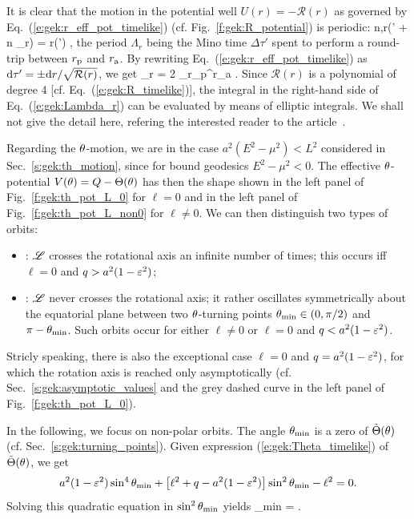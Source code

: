 It is clear that the motion in the potential well $U(r) = - \mathcal{R}(r)$
as governed by Eq.~(\ref{e:gek:r_eff_pot_timelike})
(cf. Fig.~\ref{f:gek:R_potential}) is periodic:
\be
    \forall n\in{},\quad r(\tau' + n \Lambda_r) = r(\tau') ,
\ee
the period
$\Lambda_r$ being the Mino time $\Delta\tau'$ spent to perform a round-trip
between $r_{\rm p}$ and $r_{\rm a}$. By rewriting Eq.~(\ref{e:gek:r_eff_pot_timelike})
as $\mathrm{d}\tau' = \pm \mathrm{d} r / \sqrt{\mathcal{R}(r)}$, we get
\be \label{e:gek:Lambda_r}
    \Lambda_r = 2 \int_{r_{\rm p}}^{r_{\rm a}}  .
\ee
Since $\mathcal{R}(r)$ is a polynomial of degree 4 [cf. Eq.~(\ref{e:gek:R_timelike})],
the integral in the right-hand side of Eq.~(\ref{e:gek:Lambda_r}) can
be evaluated by means of elliptic integrals. We shall not give the detail
here, refering the interested reader to the article~\cite{FujitH09}.

Regarding the $\theta$-motion, we are in the case $a^2(E^2 - \mu^2) < L^2$
considered in Sec.~\ref{s:gek:th_motion}, since for bound geodesics $E^2 - \mu^2 < 0$.
The effective $\theta$-potential $V(\theta) = Q - \Theta(\theta)$ has then the shape shown in
the left panel of Fig.~\ref{f:gek:th_pot_L_0} for $\ell=0$ and in the left panel
of Fig.~\ref{f:gek:th_pot_L_non0} for $\ell\neq 0$.
We can then distinguish two types of orbits:
\begin{itemize}
\item {}: $\mathscr{L}$ crosses the rotational axis an infinite number
of times; this occurs iff $\ell=0$ and $q > a^2 ( 1-\varepsilon^2)$;
\item {}: $\mathscr{L}$ never crosses the rotational axis; it
rather oscillates symmetrically about the equatorial plane between
two $\theta$-turning points $\theta_{\rm min} \in (0,\pi /2)$ and $\pi-\theta_{\rm min}$.
Such orbits occur for either
$\ell\not=0$ or $\ell=0$ and $q < a^2 ( 1-\varepsilon^2)$.
\end{itemize}
Stricly speaking, there is also the exceptional case $\ell=0$ and
$q = a^2 (1 -\varepsilon^2)$, for which the rotation axis is reached only
asymptotically (cf. Sec.~\ref{s:gek:asymptotic_values} and the grey dashed curve
in the left panel of Fig.~\ref{f:gek:th_pot_L_0}).

In the following, we focus on non-polar orbits.
The angle $\theta_{\rm min}$ is a zero of $\tilde{\Theta}(\theta)$ (cf. Sec.~\ref{s:gek:turning_points}). Given expression (\ref{e:gek:Theta_timelike}) of $\tilde{\Theta}(\theta)$,
we get
\[
    a^2 (1-\varepsilon^2) \sin^4\theta_{\rm min}
    + \left[ \ell^2 + q - a^2 (1-\varepsilon^2) \right] \sin^2\theta_{\rm min} - \ell^2 = 0 .
\]
Solving this quadratic equation in $\sin^2\theta_{\rm min}$ yields
\be \label{e:gek:th_min_arcsin}
    \th_{\rm min} = \arcsin{}.
\ee

